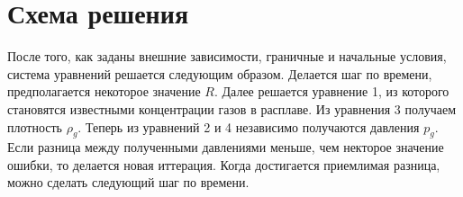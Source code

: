 \section{Схема решения}
\par После того, как заданы внешние зависимости, граничные и начальные условия, система уравнений решается следующим образом. Делается шаг по времени, предполагается некоторое значение $R$. Далее решается уравнение 1, из которого становятся известными концентрации газов в расплаве. Из уравнения 3 получаем плотность $\rho_{g}$. Теперь из уравнений 2 и 4 независимо получаются давления $p_{g}$. Если разница между полученными давлениями меньше, чем некторое значение ошибки, то делается новая иттерация. Когда достигается приемлимая разница, можно сделать следующий шаг по времени. 